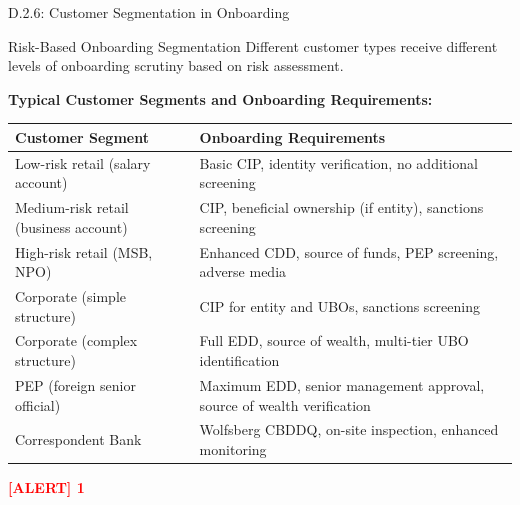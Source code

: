 \documentclass[11pt,a4paper]{beamer}
\newcommand{\redflag}[1]{\textcolor{red}{\textbf{[ALERT] 1}}}
\begin{document}
\begin{frame}{D.2.6: Customer Segmentation in Onboarding}
	\begin{block}{Risk-Based Onboarding Segmentation}
		Different customer types receive different levels of onboarding scrutiny based on risk assessment.
	\end{block}
	\textbf{Typical Customer Segments and Onboarding Requirements:}
	\begin{tabular}{p{}|p{}}
		\hline
		\rowcolor{lightgray}
		\textbf{Customer Segment} & \textbf{Onboarding Requirements} \\
		\hline
		Low-risk retail (salary account) & Basic CIP, identity verification, no additional screening \\
		\hline
		Medium-risk retail (business account) & CIP, beneficial ownership (if entity), sanctions screening \\
		\hline
		High-risk retail (MSB, NPO) & Enhanced CDD, source of funds, PEP screening, adverse media \\
		\hline
		Corporate (simple structure) & CIP for entity and UBOs, sanctions screening \\
		\hline
		Corporate (complex structure) & Full EDD, source of wealth, multi-tier UBO identification \\
		\hline
		PEP (foreign senior official) & Maximum EDD, senior management approval, source of wealth verification \\
		\hline
		Correspondent Bank & Wolfsberg CBDDQ, on-site inspection, enhanced monitoring \\
		\hline
	\end{tabular}
	\redflag{One-size-fits-all onboarding violates the risk-based approach.}
\end{frame}

\end{document}
